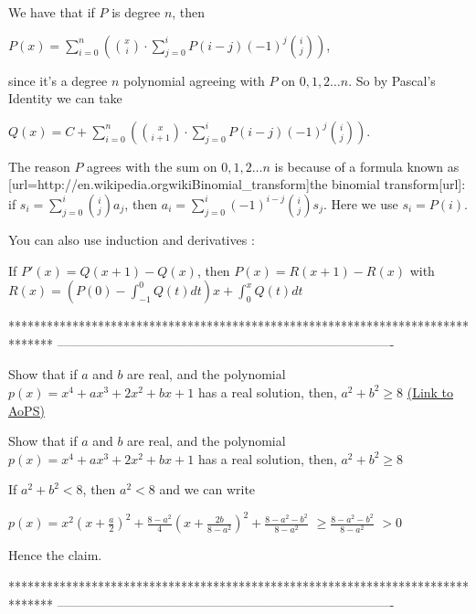 \begin{solution}
	We have that if $P$ is degree $n$, then

$P(x)=\sum_{i=0}^n\left(\binom{x}{i}\cdot\sum_{j=0}^iP(i-j)(-1)^j\binom{i}{j}\right)$,

since it's a degree $n$ polynomial agreeing with $P$ on $0, 1, 2\ldots n$.  So by Pascal's Identity we can take

$Q(x)=C+\sum_{i=0}^n\left(\binom{x}{i+1}\cdot\sum_{j=0}^iP(i-j)(-1)^j\binom{i}{j}\right)$.

The reason $P$ agrees with the sum on $0, 1, 2\ldots n$ is because of a formula known as [url=http://en.wikipedia.org\/wiki\/Binomial_transform]the binomial transform[\/url]: if $s_i=\sum_{j=0}^i\binom{i}{j}a_j$, then $a_i=\sum_{j=0}^i(-1)^{i-j}\binom{i}{j}s_j$.  Here we use $s_i=P(i)$.
\end{solution}



\begin{solution}
	You can also use induction and derivatives :

If $P'(x)=Q(x+1)-Q(x)$, then $P(x)=R(x+1)-R(x)$ with $R(x)=\left(P(0)-\int_{-1}^0Q(t)dt\right)x+\int_0^xQ(t)dt$
\end{solution}
*******************************************************************************
-------------------------------------------------------------------------------

\begin{problem}
	Show that if $a$ and $b$ are real, and the polynomial $p(x)=x^4+ax^3+2x^2+bx+1$ has a real solution,
then, $a^2+b^2 \ge 8$
	\flushright \href{https://artofproblemsolving.com/community/c6h590855}{(Link to AoPS)}
\end{problem}



\begin{solution}
	\begin{tcolorbox}Show that if $a$ and $b$ are real, and the polynomial $p(x)=x^4+ax^3+2x^2+bx+1$ has a real solution,
then, $a^2+b^2 \ge 8$\end{tcolorbox}
If $a^2+b^2<8$, then $a^2<8$ and we can write 

$p(x)=x^2\left(x+\frac a2\right)^2+\frac{8-a^2}4\left(x+\frac{2b}{8-a^2}\right)^2+\frac{8-a^2-b^2}{8-a^2}$ $\ge \frac{8-a^2-b^2}{8-a^2}$ $>0$

Hence the claim.
\end{solution}
*******************************************************************************
-------------------------------------------------------------------------------

